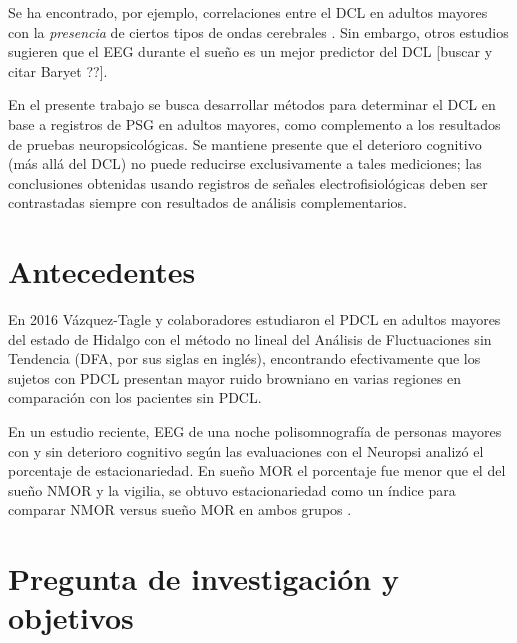 Se ha encontrado, por ejemplo, correlaciones entre el DCL en adultos mayores con la \textit{presencia} de ciertos tipos de ondas cerebrales \cite{babiloni13,prichep94,prichep06}.
%
Sin embargo, otros estudios sugieren que el EEG durante el sueño es un mejor predictor del DCL [buscar y citar Baryet ??].

En el presente trabajo se busca desarrollar métodos para determinar el DCL en base a registros de PSG en adultos mayores, como complemento a los resultados de pruebas neuropsicológicas.
%
Se mantiene presente que el deterioro cognitivo (más allá del DCL) no puede reducirse exclusivamente a tales mediciones; las conclusiones obtenidas usando registros de señales electrofisiológicas deben ser contrastadas siempre con resultados de análisis complementarios.


\section*{Antecedentes}

En 2016 Vázquez-Tagle y colaboradores estudiaron el PDCL en adultos mayores del estado de Hidalgo con el método no lineal del Análisis de Fluctuaciones sin Tendencia (DFA, por sus siglas en inglés), encontrando efectivamente que los sujetos con PDCL presentan mayor ruido browniano en varias regiones en comparación con los pacientes sin PDCL\cite{VazquezTagle16}.

En un estudio reciente, EEG de una noche polisomnografía de personas mayores con y sin deterioro cognitivo según las evaluaciones con el Neuropsi analizó el porcentaje de estacionariedad.  En sueño MOR el porcentaje fue menor que el del sueño NMOR y la vigilia, se obtuvo estacionariedad  como un índice para comparar NMOR versus sueño MOR en ambos grupos \cite{ROSALESLAGARDE2017}.


\section*{Pregunta de investigación y objetivos}

